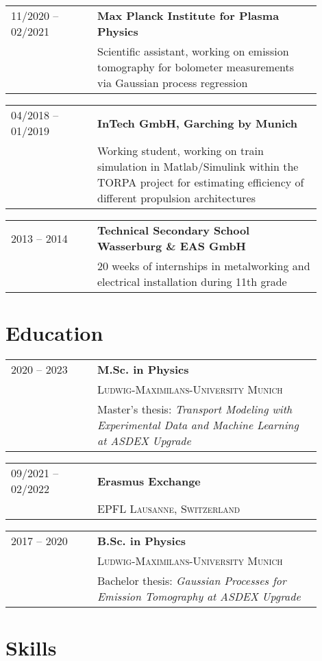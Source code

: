 \documentclass[a4paper, 10pt]{article}
\newenvironment{cventry}[2]
{   
    \setlength{\tabcolsep}{1.25em}
    \hypersetup{urlcolor=black}
    \begin{center}\hspace{-1.25cm}\begin{tabular}{p{0.25\linewidth}|p{0.65\linewidth}}
    \raggedleft\scshape #1 & \bfseries#2 \vspace{0.1cm}\\ & 
}
{\end{tabular}\end{center}}
\newcommand{\newentryline}{\\&}
\begin{document}
\begin{cventry}{11/2020 -- 02/2021}
    {Max Planck Institute for Plasma Physics}
    Scientific assistant, working on emission tomography for bolometer 
    measurements via Gaussian process regression
    \href{https://gitlab.mpcdf.mpg.de/komo/gpt-paper}{\faGitSquare} 
\end{cventry}

\begin{cventry}{04/2018 -- 01/2019}
    {InTech GmbH, Garching by Munich}
    Working student, working on train simulation in Matlab/Simulink within the 
    TORPA project for estimating efficiency of different propulsion architectures 
    \href{https://www.researchgate.net/project/TORPA-Toolbox-for-Optimal-Railway-Propulsion-Architectures}
    {\footnotesize\faIcon{link}} 
\end{cventry}

\begin{cventry}{2013 -- 2014}
    {Technical Secondary School Wasserburg \& EAS GmbH}
    20 weeks of internships in metalworking and electrical installation
    during 11th grade
\end{cventry}


\section{Education}

\begin{cventry}{2020 -- 2023}
    {M.Sc. in Physics}
    \scshape Ludwig-Maximilans-University Munich
    \newentryline Master's thesis: \slshape Transport Modeling with Experimental Data and
    Machine Learning at ASDEX Upgrade 
    \href{https://gitlab.mpcdf.mpg.de/komo/master-thesis}{\footnotesize\faIcon{link}}
\end{cventry}

\begin{cventry}{09/2021 -- 02/2022}
    {Erasmus Exchange}
    \scshape EPFL Lausanne, Switzerland
\end{cventry}

\begin{cventry}{2017 -- 2020}
    {B.Sc. in Physics}
    \scshape Ludwig-Maximilans-University Munich \newentryline
    Bachelor thesis: \slshape Gaussian Processes for Emission Tomography at 
    ASDEX Upgrade \href{https://gitlab.mpcdf.mpg.de/komo/bachelorarbeit}{\footnotesize\faIcon{link}}
\end{cventry}


\section{Skills}
\end{document}
